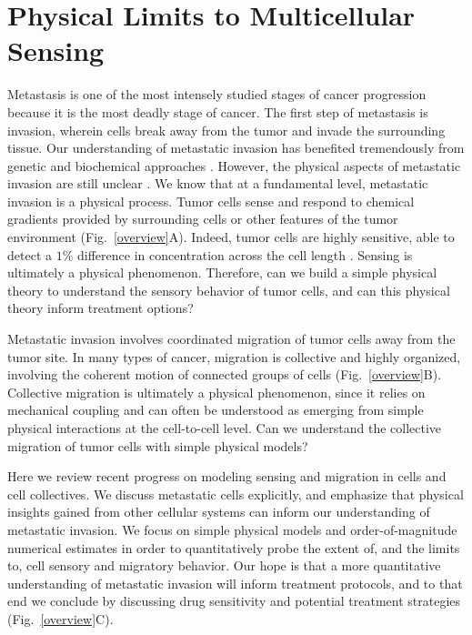 %
%

\chapter{Physical Limits to Multicellular Sensing}

Metastasis is one of the most intensely studied stages of cancer progression because it is the most deadly stage of cancer. The first step of metastasis is invasion, wherein cells break away from the tumor and invade the surrounding tissue. Our understanding of metastatic invasion has benefited tremendously from genetic and biochemical approaches \cite{leber2009molecular, hanahan2000hallmarks, hanahan2011hallmarks}. However, the physical aspects of metastatic invasion are still unclear \cite{hanahan2011hallmarks}. We know that at a fundamental level, metastatic invasion is a physical process. Tumor cells sense and respond to chemical gradients provided by surrounding cells
\cite{bhowmick2004stromal, condeelis2006macrophages, shields2007autologous, puliafito2015three} or other features of the tumor environment
\cite{shields2007autologous, polacheck2011interstitial, shieh2011regulation} (Fig.\ \ref{overview}A). Indeed, tumor cells are highly sensitive, able to detect a $1\%$ difference in concentration across the cell length
\cite{shields2007autologous}. Sensing is ultimately a physical phenomenon. Therefore, can we build a simple physical theory to understand the sensory behavior of tumor cells, and can this physical theory inform treatment options?

Metastatic invasion involves coordinated migration of tumor cells away from the tumor site. In many types of cancer, migration is collective and highly organized, involving the coherent motion of connected groups of cells
\cite{cheung2013collective, friedl2012classifying, aceto2014circulating, puliafito2015three}
(Fig.\ \ref{overview}B).
Collective migration is ultimately a physical phenomenon, since it relies on mechanical coupling and can often be understood as emerging from simple physical interactions at the cell-to-cell level. Can we understand the collective migration of tumor cells with simple physical models?

Here we review recent progress on modeling sensing and migration in cells and cell collectives. We discuss metastatic cells explicitly, and emphasize that physical insights gained from other cellular systems can inform our understanding of metastatic invasion. We focus on simple physical models and order-of-magnitude numerical estimates in order to quantitatively probe the extent of, and the limits to, cell sensory and migratory behavior. Our hope is that a more quantitative understanding of metastatic invasion will inform treatment protocols, and to that end we conclude by discussing drug sensitivity and potential treatment strategies (Fig.\ \ref{overview}C).



